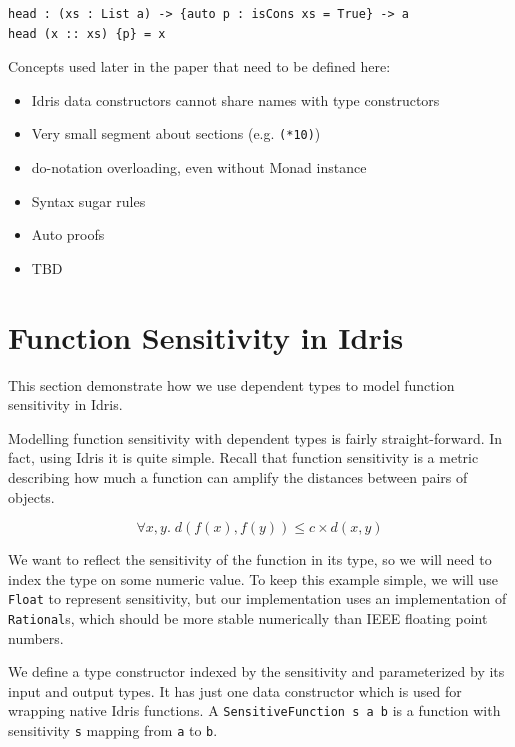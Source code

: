 \documentclass[12pt]{article}
\begin{document}
\begin{lstlisting}
head : (xs : List a) -> {auto p : isCons xs = True} -> a
head (x :: xs) {p} = x
\end{lstlisting}




Concepts used later in the paper that need to be defined here:

\begin{itemize}
\item Idris data constructors cannot share names with type constructors
\item Very small segment about sections (e.g. \texttt{(*10)})
\item do-notation overloading, even without Monad instance
\item Syntax sugar rules
\item Auto proofs
\item TBD
\end{itemize}

\section{Function Sensitivity in Idris}\label{sec:function_sensitivity}

This section demonstrate how we use dependent types to model function sensitivity in Idris.

Modelling function sensitivity with dependent types is fairly straight-forward.
In fact, using Idris it is quite simple.
Recall that function sensitivity is a metric describing how much a function can amplify the distances between pairs of objects.

$$ \forall x,y.\; d(f(x),f(y)) \le c \times d(x,y) $$

We want to reflect the sensitivity of the function in its type, so we will need to index the type on some numeric value.
To keep this example simple, we will use \texttt{Float} to represent sensitivity, but our implementation uses an implementation of \texttt{Rational}s, which should be more stable numerically than IEEE floating point numbers.

We define a type constructor indexed by the sensitivity and parameterized by its input and output types.
It has just one data constructor which is used for wrapping native Idris functions.
A \texttt{SensitiveFunction s a b} is a function with sensitivity \texttt{s} mapping from \texttt{a} to \texttt{b}.
\end{document}
